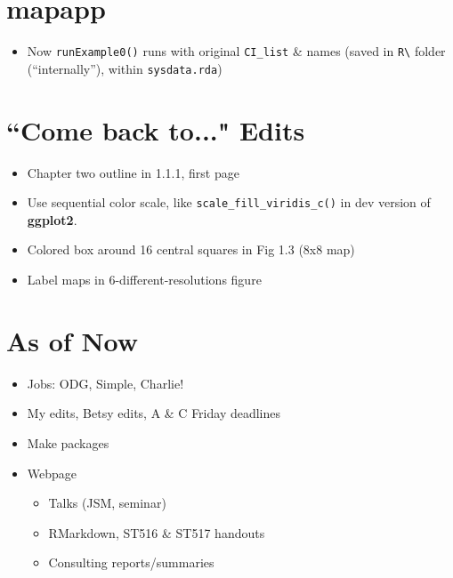 \documentclass{article}
\begin{document}
\begin{itemize}
\end{itemize}

\section*{mapapp}
\begin{itemize}
\item Now \verb|runExample0()| runs with original \verb|CI_list| \& names (saved in \verb|R\| folder (``internally''), within \verb|sysdata.rda|)
\end{itemize}

\section*{``Come back to..." Edits}
\begin{itemize}
\item Chapter two outline in 1.1.1, first page
\item Use sequential color scale, like \verb|scale_fill_viridis_c()| in dev version of {\bf ggplot2}.
\item Colored box around 16 central squares in Fig 1.3 (8x8 map)
\item Label maps in 6-different-resolutions figure
\end{itemize}

\section*{As of Now}
\begin{itemize}
\item Jobs: ODG, Simple, Charlie!
\item My edits, Betsy edits, A \& C Friday deadlines
\item Make packages
\item Webpage
  \begin{itemize}
  \item Talks (JSM, seminar)
  \item RMarkdown, ST516 \& ST517 handouts
  \item Consulting reports/summaries
  \end{itemize}
\end{itemize}

% 

\end{document}
